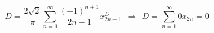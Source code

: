 \begin{equation} D=\frac{2\sqrt{2}}{\pi}\sum_{n=1}^\infty
\frac{(-1)^{n+1}}{2n-1}x_{2n-1}^D\ \ \Longrightarrow\ \
D=\sum_{n=1}^\infty 0x_{2n}=0 \label{eq:D}\end{equation} 

